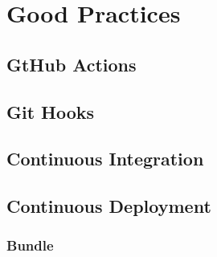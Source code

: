 \chapter{Good Practices}
\label{cha:good_practices}


\section{GtHub Actions}
\label{sec:good_practices_github_actions}

\section{Git Hooks}
\label{sec:good_practices_git_hooks}

\section{Continuous Integration}
\label{sec:good_practices_continuous_integration}

\section{Continuous Deployment}
\label{sec:good_practices_continuous_deployment}

\subsection{Bundle}
\label{subsec:good_practices_continuous_deployment_bundle}